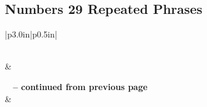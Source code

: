 \subsection{Numbers 29 Repeated Phrases}


\normalsize
 
\begin{center}
\begin{longtable}{|p{3.0in}|p{0.5in}|}
\caption[Numbers 29 Repeated Phrases]{Numbers 29 Repeated Phrases}\label{table:Repeated Phrases Numbers 29} \\
\hline {} &  \\ \hline 
\endfirsthead
 
{{\bfseries \tablename\ \thetable{} -- continued from previous page}} \\  
\hline {} &  \\ \hline 
\endhead
 

\end{longtable}
\end{center}
